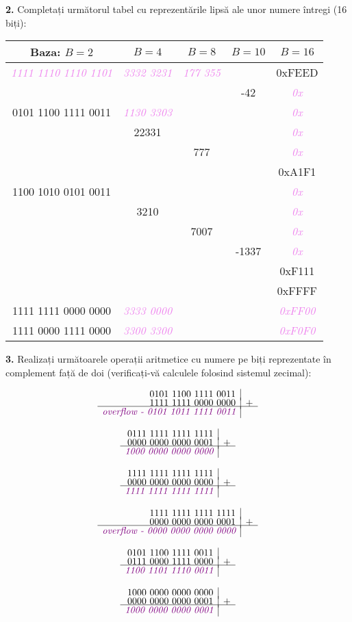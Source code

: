 \documentclass[a4paper]{article}
\renewcommand{\arraystretch}{1.4}
\newcommand{\hl}[1]{\textcolor{violet}{\textit{#1}}}
\newcommand{\binarysum}[3]{%
    \[
    \begin{array}{r|l}
    \text{#1} \\[-3pt]
    \text{#2} & + \\[-3pt]
    \hline
    \hl{#3} \\
    \end{array}
    \]
}
\begin{document}
\textbf{2.} Completați următorul tabel cu reprezentările lipsă ale unor numere întregi (16 biți):
\begin{table}[h!]
\centering
\renewcommand{\arraystretch}{1.3}
\setlength{\tabcolsep}{10pt}
\begin{tabular}{|c|c|c|c|c|}
\hline
\textbf{Baza: $B=2$} & \textbf{$B=4$} & \textbf{$B=8$} & \textbf{$B=10$} & \textbf{$B=16$} \\ \hline
 \hl{1111 1110 1110 1101} & \hl{3332 3231} & \hl{177 355} & \hl{} & 0xFEED \\ \hline
 \hl{} & \hl{} & \hl{} & -42 & \hl{0x} \\ \hline
 0101 1100 1111 0011 & \hl{1130 3303} & \hl{} & \hl{} & \hl{0x} \\ \hline
 \hl{} & 22331 & \hl{} & \hl{} & \hl{0x} \\ \hline
 \hl{} & \hl{} & 777 & \hl{} & \hl{0x} \\ \hline
 \hl{} & \hl{} & \hl{} & \hl{} & 0xA1F1\\ \hline
 1100 1010 0101 0011 & \hl{} & \hl{} & \hl{} & \hl{0x} \\ \hline
 \hl{} & 3210 & \hl{} & \hl{} & \hl{0x} \\ \hline
 \hl{} & \hl{} & 7007 & \hl{} & \hl{0x} \\ \hline
 \hl{} & \hl{} & \hl{} & -1337 & \hl{0x} \\ \hline
 \hl{} & \hl{} & \hl{} & \hl{} & 0xF111 \\ \hline
 \hl{} & \hl{} & \hl{} & \hl{} & 0xFFFF \\ \hline
 1111 1111 0000 0000 & \hl{3333 0000} & \hl{} & \hl{} & \hl{0xFF00} \\ \hline
 1111 0000 1111 0000 & \hl{3300 3300} & \hl{} & \hl{} & \hl{0xF0F0} \\ \hline
\end{tabular}
\end{table}
\vspace{0.75cm}

\textbf{3.} Realizați următoarele operații aritmetice cu numere pe biți reprezentate în complement față de doi (verificați-vă calculele folosind sistemul zecimal):
\begin{multicols}{2}
\binarysum{0101 1100 1111 0011}{1111 1111 0000 0000}{\textit{overflow} - \hl{0101 1011 1111 0011}}
\binarysum{0111 1111 1111 1111}{0000 0000 0000 0001}{\hl{1000 0000 0000 0000}}
\binarysum{1111 1111 1111 1111}{0000 0000 0000 0000}{\hl{1111 1111 1111 1111}}
\binarysum{1111 1111 1111 1111}{0000 0000 0000 0001}{\textit{overflow} - \hl{0000 0000 0000 0000}}
\binarysum{0101 1100 1111 0011}{0111 0000 1111 0000}{\hl{1100 1101 1110 0011}}
\binarysum{1000 0000 0000 0000}{0000 0000 0000 0001}{\hl{1000 0000 0000 0001}}
\end{multicols}
\end{document}
